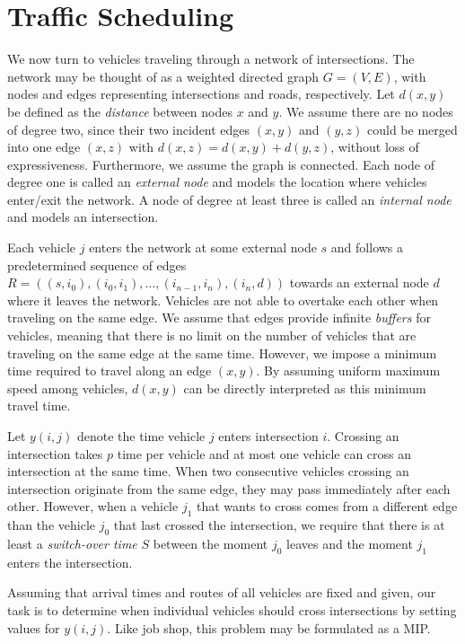 \documentclass{article}
\begin{document}
\section{Traffic Scheduling}

We now turn to vehicles traveling through a network of intersections. The
network may be thought of as a weighted directed graph $G=(V,E)$, with nodes and
edges representing intersections and roads, respectively. Let $d(x,y)$ be
defined as the \textit{distance} between nodes $x$ and $y$. We assume there are
no nodes of degree two, since their two incident edges $(x,y)$ and $(y,z)$ could
be merged into one edge $(x,z)$ with $d(x,z) = d(x,y) + d(y,z)$, without loss of
expressiveness. Furthermore, we assume the graph is connected. Each node of
degree one is called an \textit{external node} and models the location where
vehicles enter/exit the network. A node of degree at least three is called an
\textit{internal node} and models an intersection.

Each vehicle $j$ enters the network at some external node $s$ and follows a
predetermined sequence of edges
$R = ((s,i_{0}), (i_{0},i_{1}), \dots, (i_{n-1},i_{n}), (i_{n},d))$ towards an
external node $d$ where it leaves the network. Vehicles are not able to overtake
each other when traveling on the same edge. We assume that edges provide
infinite \textit{buffers} for vehicles, meaning that there is no limit on the
number of vehicles that are traveling on the same edge at the same time.
However, we impose a minimum time required to travel along an edge $(x,y)$. By
assuming uniform maximum speed among vehicles, $d(x,y)$ can be directly
interpreted as this minimum travel time.

Let $y(i,j)$ denote the time vehicle $j$ enters intersection $i$. Crossing an
intersection takes $p$ time per vehicle and at most one vehicle can cross an
intersection at the same time. When two consecutive vehicles crossing an
intersection originate from the same edge, they may pass immediately after each
other. However, when a vehicle $j_{1}$ that wants to cross comes from a
different edge than the vehicle $j_{0}$ that last crossed the intersection, we
require that there is at least a \textit{switch-over time} $S$ between the
moment $j_{0}$ leaves and the moment $j_{1}$ enters the intersection.

Assuming that arrival times and routes of all vehicles are fixed and given,
our task is to determine when individual vehicles should cross intersections by
setting values for $y(i,j)$.
Like job shop, this problem may be formulated as a MIP.
\end{document}
